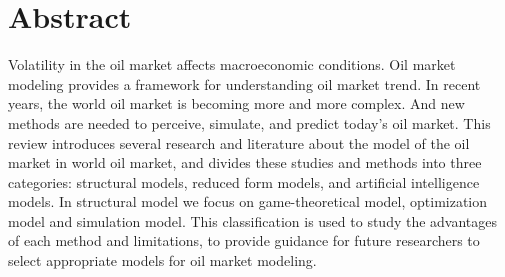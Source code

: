 \chapter*{Abstract}

Volatility in the oil market affects macroeconomic conditions.  Oil market modeling provides a framework for understanding oil market trend. In recent years, the world oil market is becoming more and more complex. And new methods are needed to perceive, simulate, and predict today's oil market. This review introduces several research and literature about the model of the oil market in world oil market, and divides these studies and methods into three categories: structural models, reduced form models, and artificial intelligence models. In structural model we focus on game-theoretical model, optimization model and simulation model. This classification is used to study the advantages of each method and limitations, to provide guidance for future researchers to select appropriate models for oil market modeling.